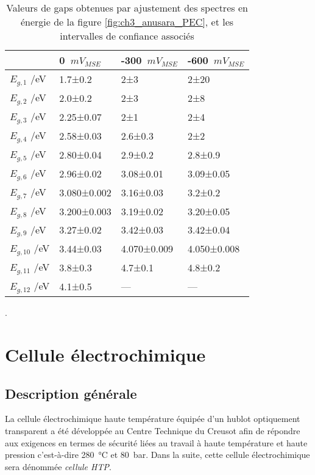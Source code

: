 \begin{refsection}
    \begin{table}[H]
        \centering
        \begin{tabular}{p{}|p{}%
                            p{}%
                            p{}}
            \toprule
            & 0~$mV_{MSE}$ & -300~$mV_{MSE}$ & -600~$mV_{MSE}$\\\midrule
            $E_{g,1}$ /eV & 1.7±0.2 & 2±3 & 2±20\\
            $E_{g,2}$ /eV& 2.0±0.2 & 2±3 & 2±8\\
            $E_{g,3}$ /eV& 2.25±0.07 & 2±1 & 2±4\\
            $E_{g,4}$ /eV& 2.58±0.03 & 2.6±0.3 & 2±2\\
            $E_{g,5}$ /eV& 2.80±0.04 & 2.9±0.2 & 2.8±0.9\\
            $E_{g,6}$ /eV& 2.96±0.02 & 3.08±0.01 & 3.09±0.05\\
            $E_{g,7}$ /eV& 3.080±0.002 & 3.16±0.03 & 3.2±0.2\\
            $E_{g,8}$ /eV& 3.200±0.003 & 3.19±0.02 & 3.20±0.05\\
            $E_{g,9}$ /eV& 3.27±0.02 & 3.42±0.03 & 3.42±0.04\\
            $E_{g,10}$ /eV& 3.44±0.03 & 4.070±0.009 & 4.050±0.008\\
            $E_{g,11}$ /eV& 3.8±0.3 & 4.7±0.1 & 4.8±0.2\\
            $E_{g,12}$ /eV& 4.1±0.5 & --- & --- \\
        \bottomrule
    \end{tabular}
    \caption{Valeurs de gaps obtenues par ajustement des spectres en énergie de la figure \ref{fig:ch3_anusara_PEC}, et
            les intervalles de confiance associés}.
    \label{tab:ch3_anusara_PEC}
    \end{table}    
    
    
\section{Cellule électrochimique}\label{sec:ch3_cell}

    \subsection{Description générale}\label{subsec:cell_global_overview}

        La cellule électrochimique haute température équipée d’un hublot optiquement transparent a été développée au Centre Technique du Creusot afin de répondre
        aux exigences en termes de sécurité liées au travail à haute température et haute pression c’est-à-dire
        \SI{280}{\degreeCelsius} et \SI{80}{\bar}.
        Dans la suite, cette cellule électrochimique sera dénommée \emph{cellule HTP}.
        

\end{refsection}
